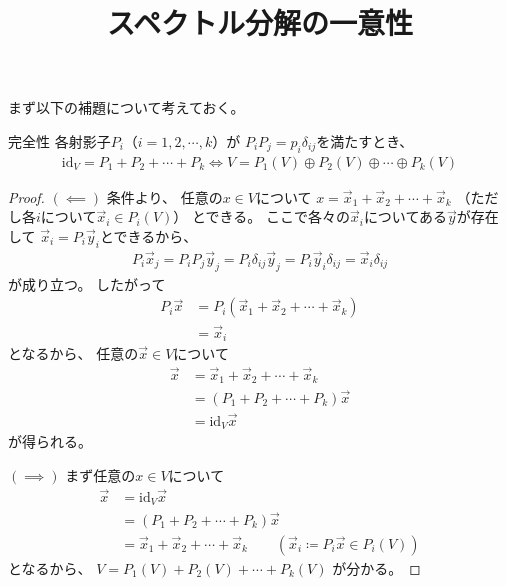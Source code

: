 \documentclass[a4paper, 10pt]{jsarticle}
\title{スペクトル分解の一意性}
\author{}
\newcommand{\id}{\mathrm{id}}
\begin{document}
\maketitle

まず以下の補題について考えておく。

\begin{lem}{}{完全性}
	各射影子$P_i$（$i = 1, 2, \cdots, k$）が
	$P_i P_j = p_i \delta_{ij}$を満たすとき、
	\begin{align}
		\id_V = P_1 + P_2 + \cdots + P_k
		\iff V = P_1(V) \oplus P_2(V) \oplus \cdots \oplus P_k(V)
	\end{align}
\end{lem}
\begin{proof}
	$(\impliedby)$
	条件より、
	任意の$x \in V$について
	$x = \vec{x}_1 + \vec{x}_2 + \cdots + \vec{x}_k$
	（ただし各$i$について$\vec{x}_i \in P_i(V)$）
	とできる。
	ここで各々の$\vec{x}_i$についてある$\vec{y}$が存在して
	$\vec{x}_i = P_i \vec{y}_i$とできるから、
	\begin{align}
		P_i \vec{x}_j = P_i P_j \vec{y}_j
		= P_i \delta_{ij} \vec{y}_j
		= P_i \vec{y}_i \delta_{ij}
		= \vec{x}_i \delta_{ij}
	\end{align}
	が成り立つ。
	したがって
	\begin{align}
		P_i \vec{x}
		&= P_i \left( \vec{x}_1 + \vec{x}_2 + \cdots + \vec{x}_k \right) \\
		&= \vec{x}_i
	\end{align}
	となるから、
	任意の$\vec{x} \in V$について
	\begin{align}
		\vec{x}
		&= \vec{x}_1 + \vec{x}_2 + \cdots + \vec{x}_k \\
		&= \left( P_1 + P_2 + \cdots + P_k \right) \vec{x} \\
		&= \id_V \vec{x}
	\end{align}
	が得られる。

	\noindent $(\implies)$
	まず任意の$x \in V$について
	\begin{align}
		\vec{x}
		&= \id_V \vec{x} \\
		&= \left( P_1 + P_2 + \cdots + P_k \right) \vec{x} \\
		&= \vec{x}_1 + \vec{x}_2 + \cdots + \vec{x}_k
		\qquad \left( \vec{x}_i \coloneqq P_i \vec{x} \in P_i (V) \right)
	\end{align}
	となるから、
	$V = P_1(V) + P_2(V) + \cdots + P_k(V)$
	が分かる。


\end{proof}
\end{document}
